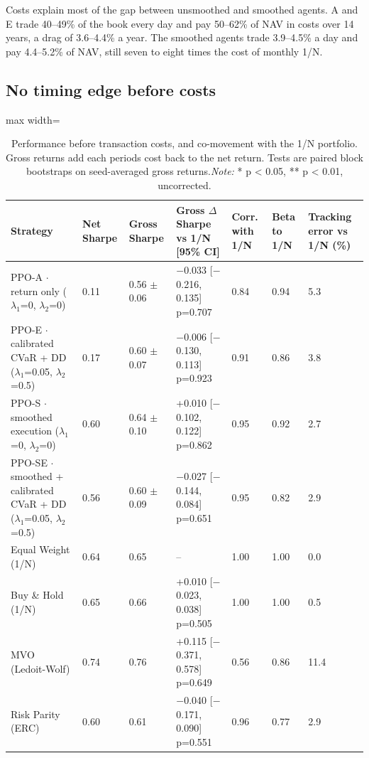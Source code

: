 \documentclass[11pt]{article}
\begin{document}
Costs explain most of the gap between unsmoothed and smoothed agents. A and E trade 40--49\% of the book every day and pay 50--62\% of NAV in costs over 14 years, a drag of 3.6--4.4\% a year. The smoothed agents trade 3.9--4.5\% a day and pay 4.4--5.2\% of NAV, still seven to eight times the cost of monthly 1/N.

\subsection{No timing edge before costs}\label{no-timing-edge-before-costs}

\begin{table}[!htbp]
\centering\scriptsize
\caption{Performance before transaction costs, and co-movement with the 1/N portfolio. Gross returns add each period\textquotesingle s cost back to the net return. Tests are paired block bootstraps on seed-averaged gross returns.\label{tab-gross-no} \emph{Note:} * p \textless{} 0.05, ** p \textless{} 0.01, uncorrected.}
\begin{adjustbox}{max width=\linewidth}
\begin{tabular}{@{}lllllll@{}}
\toprule
Strategy & Net Sharpe & Gross Sharpe & Gross $\Delta$Sharpe vs 1/N {[}95\% CI{]} & Corr. with 1/N & Beta to 1/N & Tracking error vs 1/N (\%) \\
\midrule
PPO-A $\cdot$ return only {($\lambda_1$=0, $\lambda_2$=0)} & 0.11 & 0.56{ $\pm$ 0.06} & $-$0.033 {[}$-$0.216, 0.135{]} p=0.707 & 0.84 & 0.94 & 5.3 \\
PPO-E $\cdot$ calibrated CVaR + DD {($\lambda_1$=0.05, $\lambda_2$=0.5)} & 0.17 & 0.60{ $\pm$ 0.07} & $-$0.006 {[}$-$0.130, 0.113{]} p=0.923 & 0.91 & 0.86 & 3.8 \\
PPO-S $\cdot$ smoothed execution {($\lambda_1$=0, $\lambda_2$=0)} & 0.60 & 0.64{ $\pm$ 0.10} & +0.010 {[}$-$0.102, 0.122{]} p=0.862 & 0.95 & 0.92 & 2.7 \\
PPO-SE $\cdot$ smoothed + calibrated CVaR + DD {($\lambda_1$=0.05, $\lambda_2$=0.5)} & 0.56 & 0.60{ $\pm$ 0.09} & $-$0.027 {[}$-$0.144, 0.084{]} p=0.651 & 0.95 & 0.82 & 2.9 \\
Equal Weight (1/N) & 0.64 & 0.65 & -- & 1.00 & 1.00 & 0.0 \\
Buy \& Hold (1/N) & 0.65 & 0.66 & +0.010 {[}$-$0.023, 0.038{]} p=0.505 & 1.00 & 1.00 & 0.5 \\
MVO (Ledoit-Wolf) & 0.74 & 0.76 & +0.115 {[}$-$0.371, 0.578{]} p=0.649 & 0.56 & 0.86 & 11.4 \\
Risk Parity (ERC) & 0.60 & 0.61 & $-$0.040 {[}$-$0.171, 0.090{]} p=0.551 & 0.96 & 0.77 & 2.9 \\

\end{tabular}
\end{adjustbox}
\end{table}
\end{document}
